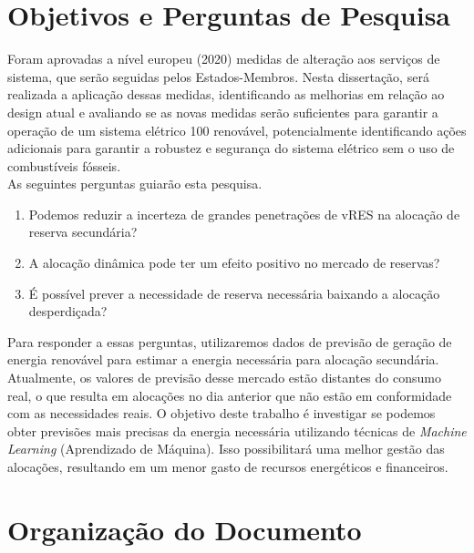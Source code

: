 \section{Objetivos e Perguntas de Pesquisa\label{se:objetivos}}

Foram aprovadas a nível europeu (2020) medidas de alteração aos serviços de sistema, que serão seguidas pelos Estados-Membros. Nesta dissertação, será realizada a aplicação dessas medidas, identificando as melhorias em relação ao design atual e avaliando se as novas medidas serão suficientes para garantir a operação de um sistema elétrico 100 renovável, potencialmente identificando ações adicionais para garantir a robustez e segurança do sistema elétrico sem o uso de combustíveis fósseis. \\

As seguintes perguntas guiarão esta pesquisa.\\

\begin{enumerate}[label=\alph*)]
  \item Podemos reduzir a incerteza de grandes penetrações de vRES na alocação de reserva secundária?
  \item A alocação dinâmica pode ter um efeito positivo no mercado de reservas?
  \item É possível prever a necessidade de reserva necessária baixando a alocação desperdiçada?
\end{enumerate}

Para responder a essas perguntas, utilizaremos dados de previsão de geração de energia renovável para estimar a energia necessária para alocação secundária. Atualmente, os valores de previsão desse mercado estão distantes do consumo real, o que resulta em alocações no dia anterior que não estão em conformidade com as necessidades reais. O objetivo deste trabalho é investigar se podemos obter previsões mais precisas da energia necessária utilizando técnicas de \textit{Machine Learning} (Aprendizado de Máquina). Isso possibilitará uma melhor gestão das alocações, resultando em um menor gasto de recursos energéticos e financeiros.

\section{Organização do Documento \label{se:organização}}

